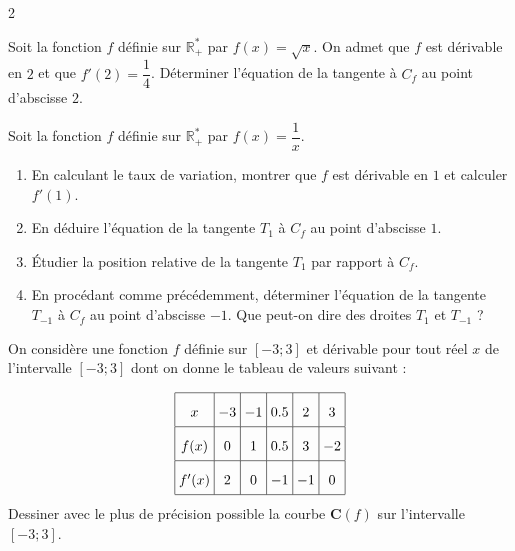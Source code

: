\documentclass[a4paper,12pt]{article}
\begin{document}
\begin{multicols}{2}
\begin{exercice}[title=Exercice 9 $\quad \star \quad$ { [Calculer] }]{}{}
Soit la fonction $f$ définie sur $\mathbb{R}_+^*$ par $f(x) = \sqrt{x}$. On admet que $f$ est dérivable en $2$ et que $f'(2) = \dfrac{1}{4}$. Déterminer l'équation de la tangente à $C_f$ au point d'abscisse $2$.
\end{exercice}

\begin{exercice}[title=Exercice 10 $\quad \star \star \quad$ { [Calculer, Représenter] }]{}{}
Soit la fonction $f$ définie sur $\mathbb{R}_+^*$ par $f(x) = \dfrac{1}{x}$.
\begin{enumerate}
    \item En calculant le taux de variation, montrer que $f$ est dérivable en $1$ et calculer $f'(1)$.
    \item En déduire l'équation de la tangente $T_1$ à $C_f$ au point d'abscisse $1$.
    \item Étudier la position relative de la tangente $T_1$ par rapport à $C_f$.
    \item En procédant comme précédemment, déterminer l'équation de la tangente $T_{-1}$ à $C_f$ au point d'abscisse $-1$. Que peut-on dire des droites $T_1$ et $T_{-1}$ ?
\end{enumerate}
\end{exercice}

\begin{exercice}[title=Exercice 11 $\quad \star \star \quad$ { [Représenter] }]{}{}
On considère une fonction $f$ définie sur $[-3; 3]$ et dérivable pour tout réel $x$ de l’intervalle $[-3; 3]$ dont on donne le tableau de valeurs suivant :

\begin{equation*}\arraycolsep=3pt\def\arraystretch{2}
\begin{array}{|c|c|c|c|c|c|c|}
    \hline
    x & -3 & -1 & 0.5 & 2 & 3 \\
    \hline
    f(x) & 0 & 1 & 0.5 & 3 & -2 \\
    \hline
    f'(x) & 2 & 0 & -1 & -1 & 0 \\
    \hline
\end{array}
\end{equation*}
Dessiner avec le plus de précision possible la courbe $\mathbf{C}(f)$ sur l'intervalle $[-3; 3]$.
\end{exercice}


\end{multicols}
\end{document}
